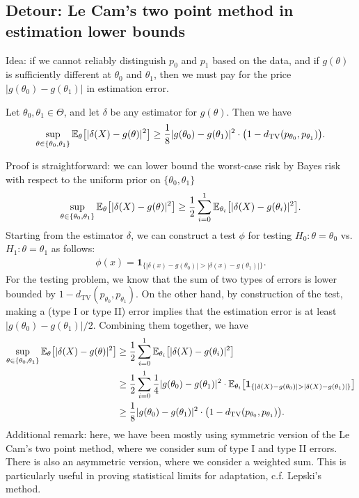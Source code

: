 \documentclass[11pt,letterpaper]{article}
\numberwithin{theorem}{lecture}
\numberwithin{proposition}{lecture}
\numberwithin{lemma}{lecture}
\numberwithin{claim}{lecture}
\numberwithin{corollary}{lecture}
\numberwithin{definition}{lecture}
\numberwithin{conjecture}{lecture}
\numberwithin{remark}{lecture}
\numberwithin{example}{lecture}
\numberwithin{equation}{lecture}
\begin{document}
\subsection{Detour: Le Cam's two point method in estimation lower bounds}
Idea: if we cannot reliably distinguish $p_0$ and $p_1$ based on the data, and if $g (\theta)$ is sufficiently different at $\theta_0$ and $\theta_1$, then we must pay for the price $|g (\theta_0) - g (\theta_1)|$ in estimation error.
\begin{theorem}
  Let $\theta_0, \theta_1 \in \Theta$, and let $\delta$ be any estimator for $g (\theta)$. Then we have
  \begin{align*}
    \sup_{\theta \in \{\theta_0, \theta_1\}} {\mathbb{E}}_\theta \big[ |\delta (X) - g (\theta)|^2 \big] \geq \frac{1}{8} |g (\theta_0) - g (\theta_1)|^2 \cdot \big( 1 - d_{\mathrm{TV}} (p_{\theta_0}, p_{\theta_1}) \big).
  \end{align*}
\end{theorem}
Proof is straightforward: we can lower bound the worst-case risk by Bayes risk with respect to the uniform prior on $\{\theta_0, \theta_1\}$
\begin{align*}
  \sup_{\theta \in \{\theta_0, \theta_1\}} {\mathbb{E}}_\theta \big[ |\delta (X) - g (\theta)|^2 \big] \geq \frac{1}{2} \sum_{i=0}^1 {\mathbb{E}}_{\theta_i} \big[ |\delta (X) - g (\theta_i)|^2 \big].
\end{align*}
Starting from the estimator $\delta$, we can construct a test $\phi$ for testing $H_0: \theta = \theta_0$ vs. $H_1: \theta = \theta_1$ as follows:
\begin{align*}
  \phi (x) = \bm{1}_{\{ |\delta (x) - g (\theta_0)| > |\delta (x) - g (\theta_1)| \}}.
\end{align*}
For the testing problem, we know that the sum of two types of errors is lower bounded by $1 - d_{\mathrm{TV}} (p_{\theta_0}, p_{\theta_1})$. On the other hand, by construction of the test, making a (type I or type II) error implies that the estimation error is at least $|g (\theta_0) - g (\theta_1)| / 2$. Combining them together, we have
\begin{align*}
  \sup_{\theta \in \{\theta_0, \theta_1\}} {\mathbb{E}}_\theta \big[ |\delta (X) - g (\theta)|^2 \big] &\geq \frac{1}{2} \sum_{i=0}^1 {\mathbb{E}}_{\theta_i} \big[ |\delta (X) - g (\theta_i)|^2 \big] \\
  &\geq \frac{1}{2} \sum_{i=0}^1 \frac{1}{4} |g (\theta_0) - g (\theta_1)|^2 \cdot {\mathbb{E}}_{\theta_i} \big[ \bm{1}_{\{ |\delta (X) - g (\theta_0)| > |\delta (X) - g (\theta_1)| \}} \big] \\
  &\geq \frac{1}{8} |g (\theta_0) - g (\theta_1)|^2 \cdot \big  ( 1 - d_{\mathrm{TV}} (p_{\theta_0}, p_{\theta_1}) \big).
\end{align*}
Additional remark: here, we have been mostly using symmetric version of the Le Cam's two point method, where we consider sum of type I and type II errors. There is also an asymmetric version, where we consider a weighted sum. This is particularly useful in proving statistical limits for adaptation, c.f. Lepski's method.
\end{document}
